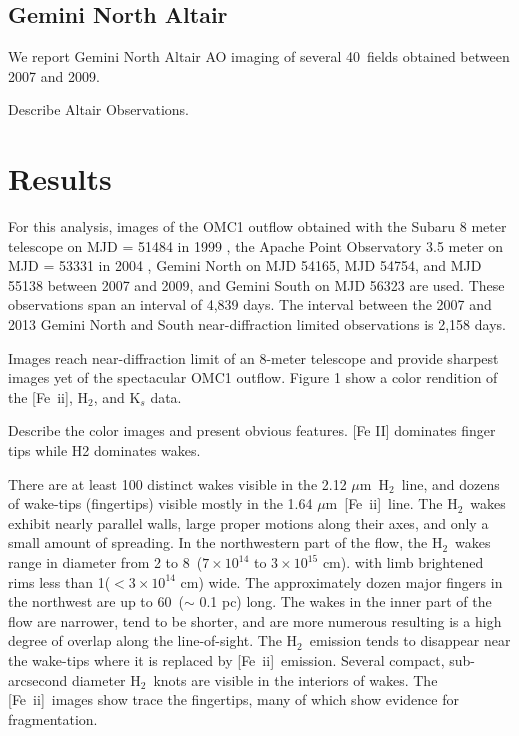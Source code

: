 \documentclass[12pt,preprint]{aastex}
\newcommand{\Feii}{[Fe~{\sc ii}]}
\newcommand{\um}{$\mu$m}
\newcommand{\hh}{\ensuremath{\textrm{H}_{2}}}			%
\begin{document}
\subsection{Gemini North Altair}
We report Gemini North Altair AO imaging of several 40\arcsec\ fields obtained 
between 2007 and 2009. 

Describe Altair Observations.

\section{Results}


For this analysis, images of the OMC1 outflow obtained with the 
Subaru 8 meter telescope on MJD = 51484 in 1999 \citep{Kaifu2000},
the Apache Point Observatory 3.5 meter on MJD = 53331 in 2004  \citep{Bally2011}, 
Gemini North on MJD 54165, MJD 54754, and MJD 55138 between 2007 and 2009, 
and Gemini South on MJD 56323 are used.   These observations span an interval of
4,839 days.   The interval between the 2007 and 2013 Gemini North and South
near-diffraction limited observations is 2,158 days.

Images reach near-diffraction limit of an 8-meter telescope and
provide sharpest images yet of the spectacular OMC1 outflow.
Figure 1 show a color rendition of the \Feii, \hh, and K$_s$
data.

Describe the color images and present obvious features.
[Fe II] dominates finger tips while H2 dominates wakes. 

There are at least 100 distinct wakes visible in the 2.12 \um\  \hh\ line, and dozens
of wake-tips (fingertips) visible mostly in the 1.64 \um\ \Feii\ line.   The \hh\  wakes exhibit
nearly parallel walls, large proper motions along their axes, and only a small amount
of spreading.    In the northwestern part of the flow, the \hh\ wakes range in diameter  from
2 to 8\arcsec\  ($7 \times 10^{14}$ to $3 \times 10^{15}$ cm). with limb brightened rims 
less than 1\arcsec ($< 3 \times 10^{14}$ cm) wide.   The approximately dozen major 
fingers in the northwest are up to 60\arcsec\   ($\sim$ 0.1 pc) long.  
The wakes in the inner part of the flow are narrower, tend to be shorter, and are 
more numerous resulting is a high degree of overlap along the line-of-sight.   
The \hh\ emission tends to disappear near the wake-tips where it is 
replaced by \Feii\ emission.    Several compact, sub-arcsecond diameter \hh\ knots are 
visible in the interiors of  wakes.      The \Feii\ images show trace the fingertips, many of which
show evidence for fragmentation.   
\end{document}
